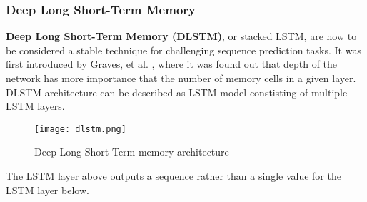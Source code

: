 \subsubsection{Deep Long Short-Term Memory}

\textbf{Deep Long Short-Term Memory (DLSTM)}, or stacked LSTM, are now to be considered a stable technique for challenging sequence prediction tasks. It was first introduced by Graves, et al. \cite{gravesDLSTM}, where it was found out that depth of the network has more importance that the number of memory cells in a given layer. DLSTM architecture can be described as LSTM model constisting of multiple LSTM layers.

\begin{figure}[H]
	\centering
    \texttt{[image: dlstm.png]}
	\caption{Deep Long Short-Term memory architecture \cite{brownleeDLSTM}}
	\label{fig:dlstm}
\end{figure}

The LSTM layer above outputs a sequence rather than a single value for the LSTM layer below. \cite{brownleeDLSTM}

